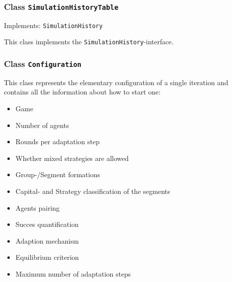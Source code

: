 \documentclass[parskip=full,11pt]{scrartcl}
\begin{document}
\subsubsection{Class \texttt{SimulationHistoryTable}}
Implements: \texttt{SimulationHistory}

This  class implements the \texttt{SimulationHistory}-interface.

\subsubsection{Class \texttt{Configuration}}
This class represents the elementary configuration of a single iteration and contains all the information about how to start one:
\begin{itemize}\itemsep -10pt
\item Game
\item Number of agents
\item Rounds per adaptation step
\item Whether mixed strategies are allowed
\item Group-/Segment formations
\item Capital- and Strategy classification of the segments
\item Agents pairing
\item Succes quantification
\item Adaption mechanism
\item Equilibrium criterion
\item Maximum number of adaptation steps
\end{itemize}
\end{document}
